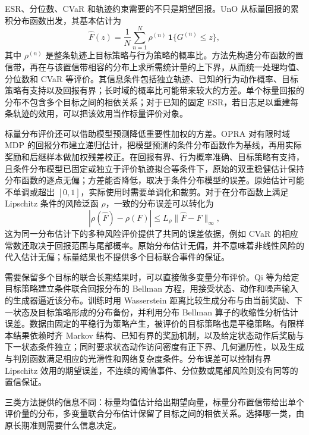 ESR、分位数、CVaR 和轨迹约束需要的不只是期望回报。UnO 从标量回报的累积分布函数出发，其基本估计为
\begin{equation}
\widehat F(z)=\frac{1}{N}\sum_{n=1}^{N}
\rho^{(n)}\,\mathbf 1\{G^{(n)}\leq z\},
\end{equation}
其中 $\rho^{(n)}$ 是整条轨迹上目标策略与行为策略的概率比。方法先构造分布函数的置信带，再在与该置信带相容的分布上求所需统计量的上下界，从而统一处理均值、分位数和 CVaR 等评价\cite{chandak2021}。其信息条件包括独立轨迹、已知的行为动作概率、目标策略有支持以及回报有界；长时域的概率比可能带来较大的方差。单个标量回报的分布不包含多个目标之间的相依关系；对于已知的固定 ESR，若日志足以重建每条轨迹的效用，可以把该效用当作标量评价对象。

标量分布评价还可以借助模型预测降低重要性加权的方差。OPRA 对有限时域 MDP 的回报分布建立递归估计，把模型预测的条件分布函数作为基线，再用实际奖励和后继样本做加权残差校正\cite{huang2022opra}。在回报有界、行为概率准确、目标策略有支持，且条件分布模型已固定或独立于评价轨迹拟合等条件下，原始的双重稳健估计保持分布函数的逐点无偏；方差能否降低，取决于条件分布模型的误差。原始估计可能不单调或超出 $[0,1]$，实际使用时需要单调化和裁剪。对于在分布函数上满足 Lipschitz 条件的风险泛函 $\rho$，一致的分布误差可以转化为
\begin{equation}
|\rho(\widehat F)-\rho(F)|
\leq L_\rho\|\widehat F-F\|_\infty,
\end{equation}
这为同一分布估计下的多种风险评价提供了共同的误差依据，例如 CVaR 的相应常数还取决于回报范围与尾部概率。原始分布估计无偏，并不意味着非线性风险的代入估计无偏；标量结果也不提供多个目标联合事件的保证。

需要保留多个目标的联合长期结果时，可以直接做多变量分布评价。Qi 等为给定目标策略建立条件联合回报分布的 Bellman 方程，用接受状态、动作和噪声输入的生成器逼近该分布\cite{qi2025distributional}。训练时用 Wasserstein 距离比较生成分布与由当前奖励、下一状态及目标策略形成的分布备份，并利用分布 Bellman 算子的收缩性分析估计误差。数据由固定的平稳行为策略产生，被评价的目标策略也是平稳策略。有限样本结果依赖时齐 Markov 结构、已知有界的奖励机制，以及给定状态动作后奖励与下一状态条件独立；同时要求状态动作访问密度有正下界、几何遍历性，以及生成与判别函数满足相应的光滑性和网络复杂度条件。分布误差可以控制有界 Lipschitz 效用的期望误差，不连续的阈值事件、分位数或尾部风险则没有同等的置信保证。

三类方法提供的信息不同：标量均值估计给出期望向量，标量分布置信带给出单个评价量的分布，多变量联合分布估计保留了目标之间的相依关系。选择哪一类，由原长期准则需要什么信息决定。

